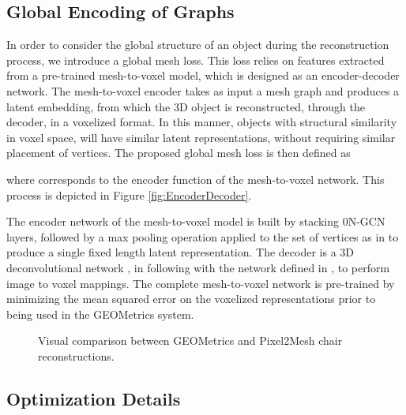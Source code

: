 \documentclass{article}
\begin{document}
\subsection{Global Encoding of Graphs}
In order to consider the global structure of an object during the reconstruction process, we introduce a global mesh loss. This loss relies on features extracted from a pre-trained mesh-to-voxel model, which is designed as an encoder-decoder network. The mesh-to-voxel encoder takes as input a mesh graph and produces a latent embedding, from which the 3D object is reconstructed, through the decoder, in a voxelized format. In this manner, objects with structural similarity in voxel space, will have similar latent representations, without requiring similar placement of vertices. The proposed global mesh loss is then defined as

where  corresponds to the encoder function of the mesh-to-voxel network. This process is depicted in  Figure \ref{fig:EncoderDecoder}. 

The encoder network of the mesh-to-voxel model is built by stacking 0N-GCN layers, followed by a max pooling operation applied to the set of vertices as in \citet{maxpooling} to produce a single fixed length latent representation. The decoder is a 3D deconvolutional network \cite{choy20163d}, in following with the network defined in \citet{mine}, to perform image to voxel mappings. The complete mesh-to-voxel network is pre-trained by minimizing the mean squared error on the voxelized representations prior to being used in the GEOMetrics system.


\begin{figure}[t!]
\captionsetup[subfloat]{captionskip=0pt}
\centering
{}\quad
{}\quad
{}
\caption{Visual comparison between GEOMetrics and Pixel2Mesh \cite{Pixel2Mesh} chair reconstructions.}
\label{fig:Pixel_compare}

\end{figure}


\subsection{Optimization Details}
\end{document}
